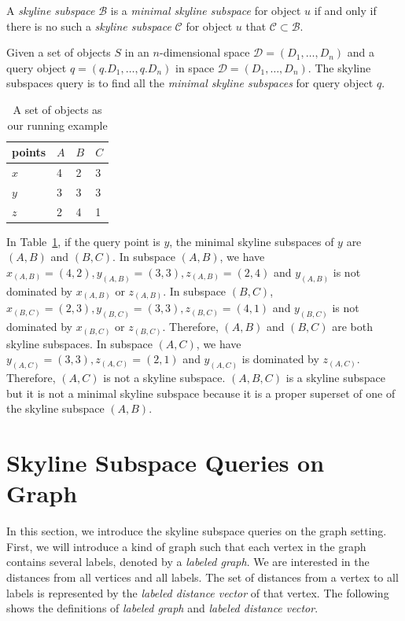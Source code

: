 \begin{definition}
A \emph{skyline subspace} $\mathcal{B}$ is a \emph{minimal skyline subspace} for object $u$ if and only if there is no such a \emph{skyline subspace} $\mathcal{C}$ for object $u$ that $\mathcal{C} \subset \mathcal{B}$.
\end{definition}

\begin{definition}
Given a set of objects $S$ in an $n$-dimensional space $\mathcal{D} = (D_1,\dots,D_n)$ and a query object $q = (q.D_1,\dots,q.D_n)$ in space $\mathcal{D} = (D_1,\dots,D_n)$. The skyline subspaces query is to find all the \emph{minimal skyline subspaces} for query object $q$.
\end{definition}

\begin{table}[h]
    \centering
    \begin{tabular}{|l|l|l|l|}
    \hline
    points & $A$ & $B$ & $C$ \\ \hline
    $x$      & 4 & 2 & 3 \\ \hline
    $y$      & 3 & 3 & 3 \\ \hline
    $z$      & 2 & 4 & 1 \\ \hline
    \end{tabular}
    \caption{\label{tab:objects_example} A set of objects as our running example}
\end{table}

In Table~\ref{tab:objects_example}, if the query point is $y$, the minimal skyline subspaces of $y$ are $(A, B)$ and $(B, C)$.
In subspace $(A, B)$, we have $x_{(A, B)} = (4, 2), y_{(A, B)} = (3, 3), z_{(A, B)} = (2, 4)$ and $y_{(A, B)}$ is not dominated by $x_{(A, B)}$ or $z_{(A, B)}$. 
In subspace $(B, C)$, $x_{(B, C)} = (2, 3), y_{(B, C)} = (3, 3), z_{(B, C)} = (4, 1)$ and $y_{(B, C)}$ is not dominated by $x_{(B, C)}$ or $z_{(B, C)}$. Therefore, $(A, B)$ and $(B, C)$ are both skyline subspaces. 
In subspace $(A, C)$, we have $y_{(A, C)} = (3, 3), z_{(A, C)} = (2, 1)$ and $y_{(A, C)}$ is dominated by $z_{(A, C)}$. Therefore, $(A, C)$ is not a skyline subspace. 
$(A, B, C)$ is a skyline subspace but it is not a minimal skyline subspace because it is a proper superset of one of the skyline subspace $(A, B)$.

\section{Skyline Subspace Queries on Graph}
In this section, we introduce the skyline subspace queries on the graph setting. First, we will introduce a kind of graph such that each vertex in the graph contains several labels, denoted by a \emph{labeled graph}. We are interested in the distances from all vertices and all labels. The set of distances from a vertex to all labels is represented by the \emph{labeled distance vector} of that vertex. The following shows the definitions of \emph{labeled graph} and \emph{labeled distance vector}.

